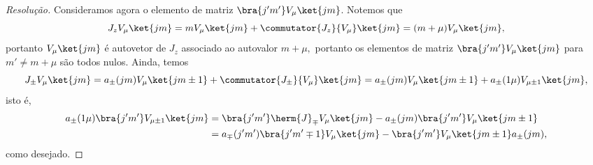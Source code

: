 \begin{proof}[Resolução]
    Consideramos agora o elemento de matriz \(\bra{j'm'}V_\mu\ket{jm}\). Notemos que
    \begin{equation*}
        J_z V_\mu \ket{jm} = m V_\mu \ket{jm} + \commutator{J_z}{V_\mu} \ket{jm} = (m + \mu) V_{\mu} \ket{jm},
    \end{equation*}
    portanto \(V_\mu\ket{jm}\) é autovetor de \(J_z\) associado ao autovalor \(m + \mu,\) portanto os elementos de matriz \(\bra{j'm'}V_\mu\ket{jm}\) para \(m' \neq m + \mu\) são todos nulos. Ainda, temos
    \begin{equation*}
        J_{\pm} V_{\mu} \ket{jm} = a_{\pm}(jm) V_{\mu} \ket{j {m\pm1}} + \commutator{J_{\pm}}{V_\mu} \ket{jm} = a_{\pm}(jm) V_{\mu} \ket{j {m\pm1}} + a_{\pm}(1\mu) V_{\mu \pm 1} \ket{jm},
    \end{equation*}
    isto é,
    \begin{align*}
        a_{\pm}(1\mu) \bra{j'm'}V_{\mu \pm 1} \ket{jm} &= \bra{j'm'} \herm{J}_{\mp} V_\mu \ket{jm} - a_{\pm}(jm) \bra{j'm'}V_\mu\ket{j{m \pm 1}}\\
                                                       &= a_{\mp}(j'm') \bra{j' {m' \mp 1}} V_{\mu} \ket{jm} - \bra{j'm'} V_{\mu} \ket{j {m\pm 1}} a_{\pm}(jm),
    \end{align*}
    como desejado.
\end{proof}
